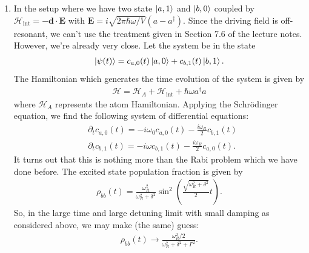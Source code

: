 \documentclass{article}
\theoremstyle{definition}
\newcommand{\p}{\partial}
\newcommand{\ham}{\mathcal{H}}
\newcommand{\f}[2]{\frac{#1}{#2}}
\newcommand{\lp}{\left(}
\newcommand{\rp}{\right)}
\begin{document}
\begin{enumerate}[label=(\alph*)]
\begin{enumerate}[label=(\roman*)]
		
		\item In the setup where we have two state $\ket{a,1}$ and $\ket{b,0}$ coupled by $\ham_\text{int} = -\bm{d}\cdot \bm{E} $ with $\bm{E} = i\sqrt{2\pi \hbar \omega/V} (a - a^\dagger)$. Since the driving field is off-resonant, we can't use the treatment given in Section 7.6 of the lecture notes. However, we're already very close. Let the system be in the state
		\begin{align*}
		\ket{\psi(t)} =  c_{a,0}(t) \ket{a,0} + c_{b,1}(t)\ket{b,1}.
		\end{align*}
		The Hamiltonian which generates the time evolution of the system is given by 
		\begin{align*}
		\ham = \ham_A + \ham_\text{int} + \hbar \omega a^\dagger a
		\end{align*}
		where $\ham_A$ represents the atom Hamiltonian. Applying the Schr\"{o}dinger equation, we find the following system of differential equations:
		\begin{align*}
		&\p_t c_{a,0}(t) = -i\omega_0 c_{a,0}(t) - \f{i\omega_R}{2} c_{b,1}(t)\\
		&\p_t c_{b,1}(t) = -i\omega c_{b,1}(t) - \f{i\omega_R}{2} c_{a,0}(t).
		\end{align*}
		It turns out that this is nothing more than the Rabi problem which we have done before. The excited state population fraction is given by 
		\begin{align*}
		\rho_{bb}(t) = \f{\omega_R^2}{\omega_R^2 + \delta^2} \sin^2 \lp  \f{\sqrt{\omega_R^2 + \delta^2}}{2}  t \rp.
		\end{align*}
		So, in the large time and large detuning limit with small damping as considered above, we may make (the same) guess:
		\begin{align*}
		\rho_{bb}(t) \to \f{\omega_R^2/2}{\omega_R^2 + \delta^2 + \Gamma^2}.
		\end{align*}
	\end{enumerate}
	

\end{enumerate}
\end{document}
